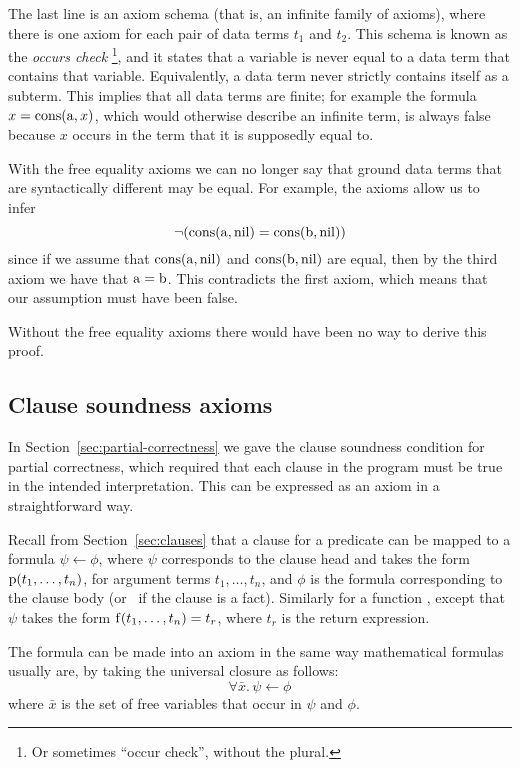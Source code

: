 The last line is an axiom schema
(that is, an infinite family of axioms),
where there is one axiom for each pair of data terms $t_1$ and $t_2$.
This schema is known as the \emph{occurs check\label{gi:occurs-check}}%
\footnote{
Or sometimes ``occur check'', without the plural.
},
and it states that a variable is never equal to
a data term that contains that variable.
Equivalently,
a data term never strictly contains itself as a subterm.
This implies that all data terms are finite;
for example the formula $x = \operatorname{cons}(\operatorname{a}, x)$,
which would otherwise describe an infinite term,
is always false because $x$ occurs in the term
that it is supposedly equal to.

With the free equality axioms we can no longer say that
ground data terms that are syntactically different may be equal.
For example, the axioms allow us to infer
\[
    \lnot (\operatorname{cons}(\operatorname{a}, \operatorname{nil}) = \operatorname{cons}(\operatorname{b}, \operatorname{nil}))
\]
since if we assume that
$\operatorname{cons}(\operatorname{a}, \operatorname{nil})$
and
$\operatorname{cons}(\operatorname{b}, \operatorname{nil})$
are equal,
then by the third axiom we have that $\operatorname{a} = \operatorname{b}$.
This contradicts the first axiom,
which means that our assumption must have been false.

Without the free equality axioms there would have been
no way to derive this proof.


\subsection{Clause soundness axioms}
\label{sec:ax-clause-soundness}

In Section~\ref{sec:partial-correctness}
we gave the clause soundness condition
for partial correctness,
which required that each clause in the program
must be true in the intended interpretation.
This can be expressed as an axiom
in a straightforward way.

Recall from Section~\ref{sec:clauses}
that a clause for a predicate 
can be mapped to a formula $\psi \leftarrow \phi$,
where $\psi$ corresponds to the clause head
and takes the form $\operatorname{p}(t_1, \ldots, t_n)$,
for argument terms $t_1, \ldots, t_n$,
and $\phi$ is the formula corresponding to the clause body
(or \true\ if the clause is a fact).
Similarly for a function ,
except that $\psi$ takes the form $\operatorname{f}(t_1, \ldots, t_n) = t_r$,
where $t_r$ is the return expression.

The formula can be made into an axiom
in the same way mathematical formulas usually are,
by taking the universal closure as follows:
\[ \forall \bar{x}.\, \psi \leftarrow \phi \]
where $\bar{x}$ is the set of free variables
that occur in $\psi$ and $\phi$.

